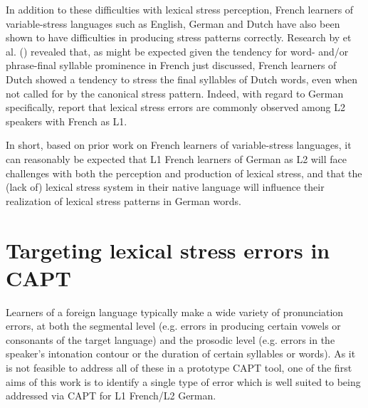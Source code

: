   In addition to these difficulties with lexical stress perception, French learners of variable-stress languages such as English, German and Dutch have also been shown to have difficulties in producing stress patterns correctly. Research by \citeauthor{Michaux2012} et al. (\citeyear{Michaux2012,Michaux2013}) revealed that, as might be expected given the tendency for word- and/or phrase-final syllable prominence in French just discussed, French learners of Dutch  showed a tendency to stress the final syllables of Dutch words, even when not called for by the canonical stress pattern. 
  Indeed, with regard to German specifically, \textcite{Hirschfeld2007} report that lexical stress errors are commonly observed among L2 speakers with French as L1.
  
 In short, based on prior work on French learners of variable-stress languages,
 it can reasonably be expected that L1 French learners of German as L2 will face challenges with both the perception and production of lexical stress, and that the (lack of) lexical stress system in their native language will influence their realization of lexical stress patterns in German words.

		
		
 \section{Targeting lexical stress errors in CAPT}
 \label{sec:bkgd:targeting}
 	Learners of a foreign language typically make a wide variety of pronunciation errors, at both the segmental level (e.g. errors in producing certain vowels or consonants of the target language) and the prosodic level (e.g. errors in the speaker's intonation contour or the duration of certain syllables or words). 
 As it is not feasible to address all of these in a prototype CAPT tool, 
one of the first aims of this work is to identify a single type of error which is well suited to being addressed via CAPT for L1 French/L2 German.
	
